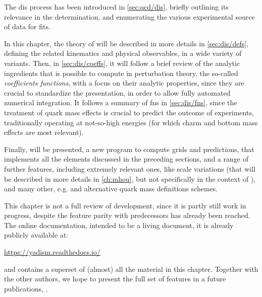 
The \acrfull{dis} process has been introduced in \cref{sec:qcd/dis}, briefly
outlining its relevance in the \pdf determination, and enumerating the various
experimental source of \dis data for \pdf fits.

In this chapter, the theory of \dis will be described in more details in
\cref{sec:dis/defs}, defining the related kinematics and physical observables,
in a wide variety of variants.
Then, in \cref{sec:dis/coeffs}, it will follow a brief review of the analytic
ingredients that is possible to compute in perturbation theory, the so-called
\textit{coefficients functions}, with a focus on their analytic properties,
since they are crucial to standardize the presentation, in order to allow fully
automated numerical integration.
It follows a summary of \acrlong{fns} in \cref{sec:dis/fns}, since the
treatment of quark mass effects is crucial to predict the outcome of \dis
experiments, traditionally operating at not-so-high energies (for which charm
and bottom mass effects are most relevant).

Finally, \yadism will be presented, a new program to compute \dis grids and
predictions, that implements all the elements discussed in the preceding
sections, and a range of further features, including extremely relevant ones,
like scale variations (that will be described in more details in
\cref{ch:mhou}, but not specifically in the context of \dis), and many other,
e.g. \tmc and alternative quark mass definitions schemes.

This chapter is not a full review of \yadism development, since it is partly
still work in progress, despite the feature parity with predecessors has
already been reached.
%
The online documentation, intended to be a living document, it is already
publicly available at:
\begin{center}
  \url{https://yadism.readthedocs.io/}
\end{center}
and contains a superset of (almost) all the material in this chapter.
%
Together with the other authors, we hope to present the full set of features in
a future publications, \cite{yadism}.
